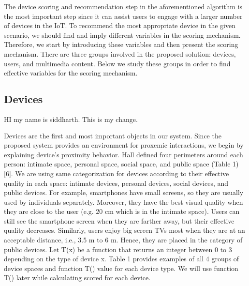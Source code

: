 \documentclass[]{IEEEphot}
\begin{document}
The device scoring and recommendation step in the aforementioned algorithm is the most important step since it can assist users to engage with a larger
number of devices in the IoT. To recommend the most appropriate device in the
given scenario, we should find and imply different variables in the scoring mechanism. Therefore, we start by introducing these variables and then present the
scoring mechanism. There are three groups involved in the proposed solution:
devices, users, and multimedia content. Below we study these groups in order to
find effective variables for the scoring mechanism.

\subsection{Devices}
HI my name is siddharth. This is my change.



Devices are the first and most important objects in our system. Since the proposed system provides an environment for proxemic interactions, we begin by
explaining device’s proximity behavior. Hall defined four perimeters around each
person: intimate space, personal space, social space, and public space (Table 1)
[6]. We are using same categorization for devices according to their effective quality in each space: intimate devices, personal devices, social devices, and public
devices. For example, smartphones have small screens, so they are usually used
by individuals separately. Moreover, they have the best visual quality when they
are close to the user (e.g. 20 cm which is in the intimate space). Users can still
see the smartphone screen when they are farther away, but their effective quality decreases. Similarly, users enjoy big screen TVs most when they are at an
acceptable distance, i.e., 3.5 m to 6 m. Hence, they are placed in the category
of public devices. Let T(x) be a function that returns an integer between 0 to 3
depending on the type of device x. Table 1 provides examples of all 4 groups of
device spaces and function T() value for each device type. We will use function
T() later while calculating scored for each device.
\end{document}

